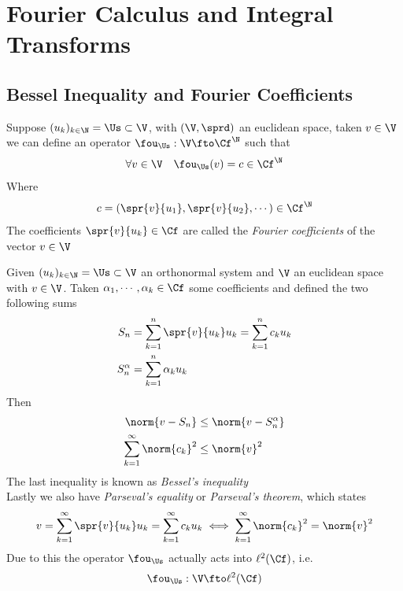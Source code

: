 \documentclass[../mmf.tex]{subfiles}
\begin{document}
\chapter{Fourier Calculus and Integral Transforms}
\section{Bessel Inequality and Fourier Coefficients}
\begin{dfn}
	Suppose $(u_k)_{k\in\N}=\Us\subset\V$, with $(\V,\sprd)$ an euclidean space, taken $v\in\V$ we can define an operator $\fou_{\Us}:\V\fto\Cf^{\N}$ such that
	\begin{equation*}
		\forall v\in\V\quad\fou_{\Us}(v)=c\in\Cf^{\N}
	\end{equation*}
	Where
	\begin{equation*}
		c=(\spr{v}{u_1},\spr{v}{u_2},\cdots)\in\Cf^{\N}
	\end{equation*}
	The coefficients $\spr{v}{u_k}\in\Cf$ are called the \textit{Fourier coefficients} of the vector $v\in\V$
\end{dfn}
\begin{thm}
	Given $(u_k)_{k\in\N}=\Us\subset\V$ an orthonormal system and $\V$ an euclidean space with $v\in\V$. Taken $\alpha_1,\cdots,\alpha_k\in\Cf$ some coefficients and defined the two following sums
	\begin{equation*}
		\begin{aligned}
			S_n&=\sum_{k=1}^{n}\spr{v}{u_k}u_k=\sum_{k=1}^{n}c_ku_k\\
			S_n^\alpha&=\sum_{k=1}^{n}\alpha_ku_k
		\end{aligned}
	\end{equation*}
	Then
	\begin{equation*}
		\begin{aligned}
			\norm{v-S_n}&\le\norm{v-S_n^\alpha}\\
			\sum_{k=1}^{\infty}\norm{c_k}^2&\le\norm{v}^2\\
		\end{aligned}
	\end{equation*}
	The last inequality is known as \textit{Bessel's inequality}\\
	Lastly we also have \textit{Parseval's equality} or \textit{Parseval's theorem}, which states
	\begin{equation*}
		v=\sum_{k=1}^{\infty}\spr{v}{u_k}u_k=\sum_{k=1}^{\infty}c_ku_k\iff\sum_{k=1}^{\infty}\norm{c_k}^2=\norm{v}^2
	\end{equation*}
	Due to this the operator $\fou_{\Us}$ actually acts into $\ell^2(\Cf)$, i.e.
	\begin{equation*}
		\fou_{\Us}:\V\fto\ell^2(\Cf)
	\end{equation*}
\end{thm}
\end{document}
